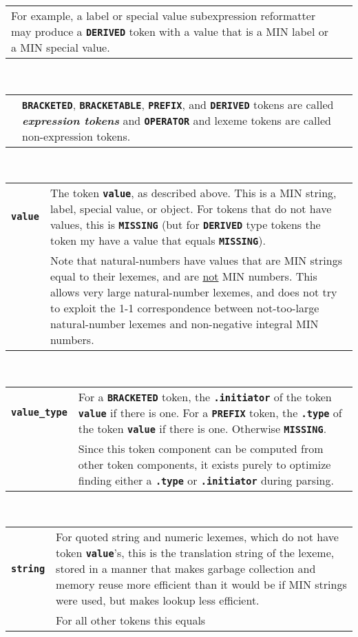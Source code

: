 \documentclass[12pt]{article}
\makeatletter
\newcommand{\TT}[1]{{\tt \bfseries #1}}
\newcommand{\skey}[2]{{\bf \em #1#2}\index{#1}}
\newcommand{\ttmkey}[2]{\TT{#1}\index{#1@{\tt #1}!#2}}
\newenvironment{indpar}[1][0.3in]%
	{\begin{list}{}%
		     {\setlength{\itemsep}{0in}%
		      \setlength{\topsep}{0in}%
		      \setlength{\parsep}{1ex}%
		      \setlength{\labelwidth}{#1}%
		      \setlength{\leftmargin}{#1}%
		      \addtolength{\leftmargin}{\labelsep}}%
	 \item}%
	{\end{list}}
\makeatother
\begin{document}
\begin{indpar}
\begin{tabular}{p{1in}p{4.5in}}
		  For example, a label or special value
		  subexpression reformatter may
		  produce a \TT{DERIVED} token with a value that is
		  a MIN label or a MIN special value.
\end{tabular}
\\[1ex]  
\begin{tabular}{p{1in}p{4.5in}}
		& \TT{BRACKETED}, \TT{BRACKETABLE}, \TT{PREFIX},
		  and \TT{DERIVED}
		  tokens are called
		  \skey{expression token}s and \TT{OPERATOR} and lexeme
		  tokens are called non-expression tokens.
\end{tabular}
\\[1ex]
\begin{tabular}{p{1in}p{4.5in}}
\ttmkey{value}{of token}
		& The token \TT{value}, as described above.  This is
		  a MIN string, label, special value, or object.
		  For tokens that do not have values, this is \TT{MISSING}
		  (but for \TT{DERIVED} type tokens the token my have
		  a value that equals \TT{MISSING}).
\\[1ex]
		& Note that natural-numbers have values that are MIN
		  strings equal to their lexemes,
		  and are \underline{not} MIN numbers.
		  This allows very large natural-number lexemes,
		  and does not try to exploit the 1-1 correspondence
		  between not-too-large natural-number lexemes and
		  non-negative integral MIN numbers.
\end{tabular}
\\[1ex]
\begin{tabular}{p{1in}p{4.5in}}
\ttmkey{value\_type}{of token}
		& For a \TT{BRACKETED} token, the \TT{.initiator}
		  of the token \TT{value} if there is one.  For a
		  \TT{PREFIX} token, the \TT{.type} of the token
		  \TT{value} if there is one.  Otherwise \TT{MISSING}.
\\[1ex]
		& Since this token component can be computed from other
		  token components, it exists purely to optimize finding
		  either a \TT{.type} or \TT{.initiator} during parsing.
\end{tabular}
\\[1ex]
\begin{tabular}{p{1in}p{4.5in}}
\ttmkey{string}{of token}
		& For quoted string and numeric lexemes,
		  which do not have token \TT{value}'s,
                  this is the translation string of the lexeme,
		  stored in a manner that makes
		  garbage collection and memory reuse more
		  efficient than it would be if MIN strings
		  were used, but makes lookup less efficient.
\\[1ex]
		& For all other tokens this equals

\end{tabular}
\end{indpar}
\end{document}
